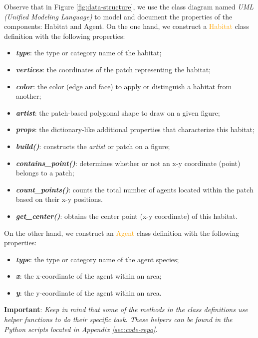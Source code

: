 \noindent
Observe that in Figure \ref{fig:data-structure}, we use the class diagram named \emph{UML (Unified Modeling Language)} to model and document the properties of the components: Habitat and Agent. On the one hand, we construct a \textcolor{orange}{Habitat} class definition with the following properties:
\begin{itemize}
    \item \textbf{\textit{type}}: the type or category name of the habitat;
    \item \textbf{\textit{vertices}}: the coordinates of the patch representing the habitat;
    \item \textbf{\textit{color}}: the color (edge and face) to apply or distinguish a habitat from another;
    \item \textbf{\textit{artist}}: the patch-based polygonal shape to draw on a given figure;
    \item \textbf{\textit{props}}: the dictionary-like additional properties that characterize this habitat;
    \item \textbf{\textit{build()}}: constructs the \emph{artist} or patch on a figure;
    \item \textbf{\textit{contains\_point()}}: determines whether or not an x-y coordinate (point) belongs to a patch;
    \item \textbf{\textit{count\_points()}}: counts the total number of agents located within the patch based on their x-y positions.
    \item \textbf{\textit{get\_center()}}: obtains the center point (x-y coordinate)  of this habitat.
\end{itemize}

\noindent
On the other hand, we construct an \textcolor{orange}{Agent} class definition with the following properties:
\begin{itemize}
    \item \textbf{\textit{type}}: the type or category name of the agent species;
    \item \textbf{\textit{x}}: the x-coordinate of the agent within an area;
    \item \textbf{\textit{y}}: the y-coordinate of the agent within an area.
\end{itemize}

\noindent
\textbf{Important}: \textit{Keep in mind that some of the methods in the class definitions use helper functions to do their specific task. These helpers can be found in the Python \cite{python} scripts located in Appendix \ref{sec:code-repo}.}

